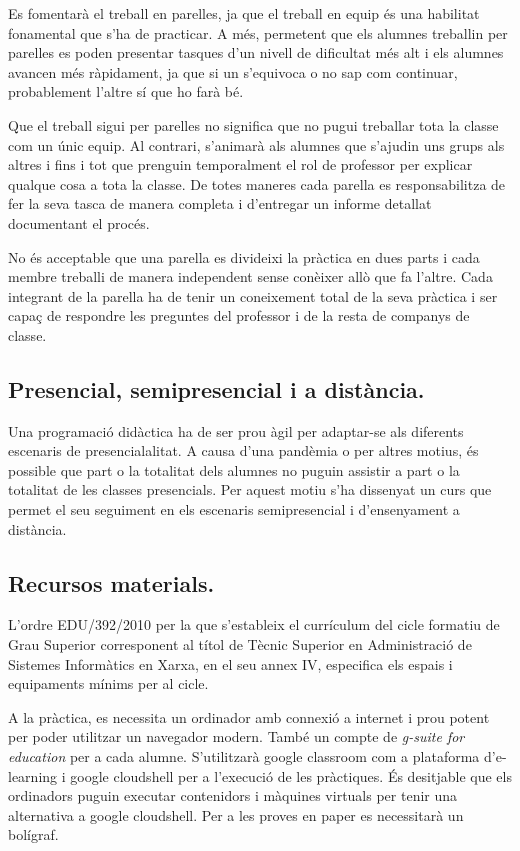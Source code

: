 \documentclass[catalan, a4paper, 12pt, titlepage]{article}
\begin{document}
Es fomentarà el treball en parelles, ja que el treball en equip és una habilitat fonamental que s'ha de practicar.
A més, permetent que els alumnes treballin per parelles es poden presentar tasques d'un nivell de dificultat més alt i els alumnes avancen més ràpidament, ja que si un s'equivoca o no sap com continuar, probablement l'altre sí que ho farà bé.

Que el treball sigui per parelles no significa que no pugui treballar tota la classe com un únic equip.
Al contrari, s'animarà als alumnes que s'ajudin uns grups als altres i fins i tot que prenguin temporalment el rol de professor per explicar qualque cosa a tota la classe.
De totes maneres cada parella es responsabilitza de fer la seva tasca de manera completa i d'entregar un informe detallat documentant el procés.

No és acceptable que una parella es divideixi la pràctica en dues parts i cada membre treballi de manera independent sense conèixer allò que fa l'altre. 
Cada integrant de la parella ha de tenir un coneixement total de la seva pràctica i ser capaç de respondre les preguntes del professor i de la resta de companys de classe.

\subsection{Presencial, semipresencial i a distància.}

Una programació didàctica ha de ser prou àgil per adaptar-se als diferents escenaris de presencialalitat.
A causa d'una pandèmia o per altres motius, és possible que part o la totalitat dels alumnes no puguin assistir a part o la totalitat de les classes presencials.
Per aquest motiu s'ha dissenyat un curs que permet el seu seguiment en els escenaris semipresencial i d'ensenyament a distància.

\subsection{Recursos materials.}

L'ordre EDU/392/2010 per la que s'estableix el currículum del cicle formatiu de Grau Superior corresponent al títol de Tècnic Superior en Administració de Sistemes Informàtics en Xarxa, en el seu annex IV, especifica els espais i equipaments mínims per al cicle.

A la pràctica, es necessita un ordinador amb connexió a internet i prou potent per poder utilitzar un navegador modern. També un compte de \emph{g-suite for education} per a cada alumne. S'utilitzarà google classroom com a plataforma d'e-learning i google cloudshell per a l'execució de les pràctiques. És desitjable que els ordinadors puguin executar contenidors i màquines virtuals per tenir una alternativa a google cloudshell. Per a les proves en paper es necessitarà un bolígraf.
\end{document}
